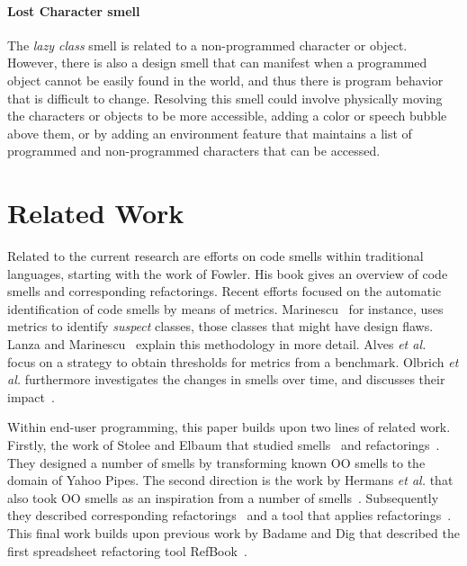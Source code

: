 \documentclass{sig-alternate}
\begin{document}
\paragraph{Lost Character smell}
The \emph{lazy class} smell is related to a non-programmed character or object. However, there is also a design smell that can manifest when a programmed object cannot be easily found in the world, and thus there is program behavior that is difficult to change. Resolving this smell could involve physically moving the characters or objects to be more accessible, adding a color or speech bubble above them, or by adding an environment feature that maintains a list of programmed and non-programmed characters that can be accessed. 	

\section{Related Work}

\label{sec:related_work}
Related to the current research are efforts on code smells within traditional languages, starting with the work of Fowler\cite{Fowl1999}. His book gives an overview of code smells and corresponding refactorings. Recent efforts focused on the automatic identification of code smells by means of metrics. Marinescu~\cite{Mari2001} for instance, uses metrics to identify \emph{suspect} classes, those classes that might have design flaws. Lanza and Marinescu~\cite{Lanz06} explain this methodology in more detail. Alves \emph{et al.}~\cite{Alves2010} focus on a strategy to obtain thresholds for metrics from a benchmark. Olbrich \emph{et al.} furthermore investigates the changes in smells over time, and discusses their impact~\cite{Olbr2009}.

Within end-user programming, this paper builds upon two lines of related work. Firstly, the work of Stolee and Elbaum that studied smells~\cite{StoleeTSE2013} and refactorings~\cite{Stolee2011}. They designed a number of smells by transforming known OO smells to the domain of Yahoo Pipes. The second direction is the work by Hermans \emph{et al.} that also took OO smells as an inspiration from a number of smells~\cite{Hermans2012intra, Hermans2012inter}. Subsequently they described corresponding refactorings~\cite{Hermans2012intraExt} and a tool that applies refactorings~\cite{hermans2014bumblebee}. This final work builds upon previous work by Badame and Dig that described the first spreadsheet refactoring tool RefBook~\cite{badame2012refactoring}.
\end{document}
